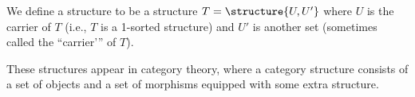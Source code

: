 \begin{definition}
We define a  structure to be a structure
$T=\structure{U,U'}$ where $U$ is the carrier of $T$ (i.e., $T$ is a
1-sorted structure) and $U'$ is another set (sometimes called the
``carrier'\thinspace'' of $T$).

These structures appear in category theory, where a category structure consists
of a set of objects and a set of morphisms equipped with some extra
structure. 
\end{definition}